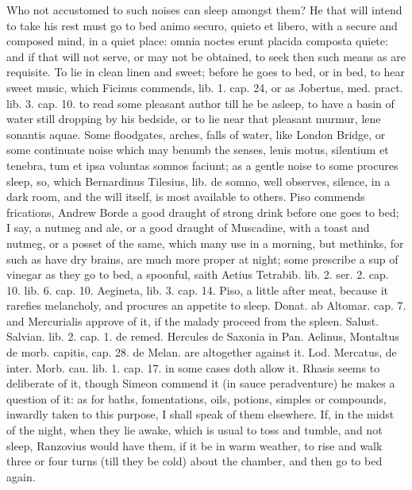 {Who not accustomed to such noises can sleep amongst them? He that will
intend to take his rest must go to bed animo securo, quieto et libero,
with a secure and composed mind, in a quiet place: omnia noctes
erunt placida composta quiete: and if that will not serve, or may not
be obtained, to seek then such means as are requisite. To lie in clean
linen and sweet; before he goes to bed, or in bed, to hear sweet
music, which Ficinus commends, lib. 1. cap. 24, or as Jobertus, med.
pract. lib. 3. cap. 10. to read some pleasant author till he be
asleep, to have a basin of water still dropping by his bedside, or to
lie near that pleasant murmur, lene sonantis aquae. Some floodgates,
arches, falls of water, like London Bridge, or some continuate noise
which may benumb the senses, lenis motus, silentium et tenebra, tum et
ipsa voluntas somnos faciunt; as a gentle noise to some procures sleep,
so, which Bernardinus Tilesius, lib. de somno, well observes, silence,
in a dark room, and the will itself, is most available to others. Piso
commends frications, Andrew Borde a good draught of strong drink before
one goes to bed; I say, a nutmeg and ale, or a good draught of
Muscadine, with a toast and nutmeg, or a posset of the same, which many
use in a morning, but methinks, for such as have dry brains, are much
more proper at night; some prescribe a  sup of vinegar as they go
to bed, a spoonful, saith Aetius Tetrabib. lib. 2. ser. 2. cap. 10.
lib. 6. cap. 10. Aegineta, lib. 3. cap. 14. Piso, a little after meat,
because it rarefies melancholy, and procures an appetite to
sleep. Donat. ab Altomar. cap. 7. and Mercurialis approve of it, if the
malady proceed from the spleen. Salust. Salvian. lib. 2. cap. 1.
de remed. Hercules de Saxonia in Pan. Aelinus, Montaltus de morb.
capitis, cap. 28. de Melan. are altogether against it. Lod. Mercatus,
de inter. Morb. cau. lib. 1. cap. 17. in some cases doth allow it.
Rhasis seems to deliberate of it, though Simeon commend it (in
sauce peradventure) he makes a question of it: as for baths,
fomentations, oils, potions, simples or compounds, inwardly taken to
this purpose,  I shall speak of them elsewhere. If, in the midst
of the night, when they lie awake, which is usual to toss and tumble,
and not sleep,  Ranzovius would have them, if it be in warm
weather, to rise and walk three or four turns (till they be cold) about
the chamber, and then go to bed again.

}
